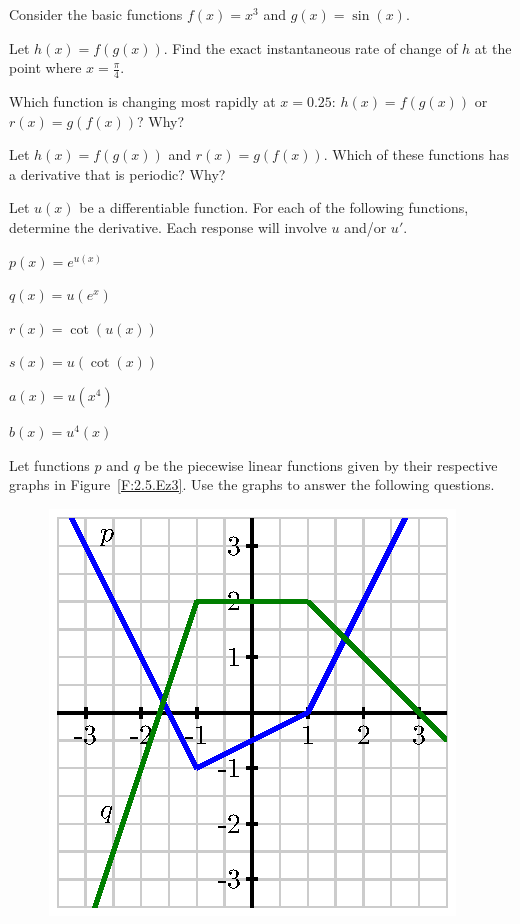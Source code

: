 \begin{exercises} 
\item Consider the basic functions $f(x) = x^3$ and $g(x) = \sin(x)$.
\ba
	\item Let $h(x) = f(g(x))$.  Find the exact instantaneous rate of change of $h$ at the point where $x = \frac{\pi}{4}.$
	\item Which function is changing most rapidly at $x = 0.25$:  $h(x) = f(g(x))$ or $r(x) = g(f(x))$?  Why?
	\item Let $h(x) = f(g(x))$ and $r(x) = g(f(x))$.  Which of these functions has a derivative that is periodic?  Why?
\ea
\item Let $u(x)$ be a differentiable function.  For each of the following functions, determine the derivative.  Each response will involve $u$ and/or $u'$.
\ba
	\item $p(x) = e^{u(x)}$
	\item $q(x) = u(e^x)$
	\item $r(x) = \cot(u(x))$
	\item $s(x) = u(\cot(x))$
	\item $a(x) = u(x^4)$
	\item $b(x) = u^4(x)$
\ea
\item Let functions $p$ and $q$ be the piecewise linear functions given by their respective graphs in Figure~\ref{F:2.5.Ez3}.  Use the graphs to answer the following questions.
\begin{figure}[h]
\begin{center}
\includegraphics{figures/2_1_Ez3.eps}

\end{center}
\end{figure}
\end{exercises}

